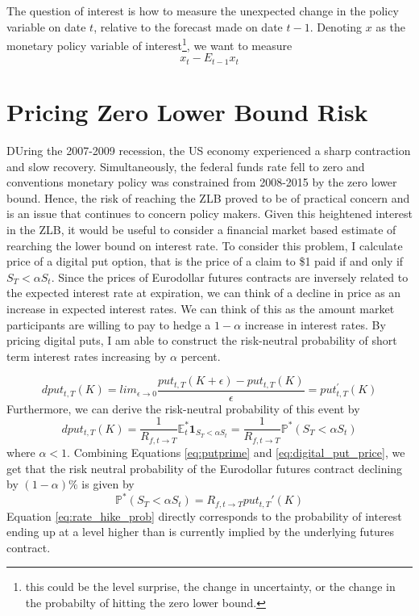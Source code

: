 \documentclass[11pt]{article}
\begin{document}
The question of interest is how to measure the unexpected change in the policy variable on date $t$, relative to the forecast made on date $t-1$. Denoting $x$ as the monetary policy variable of interest\footnote{this could be the level surprise, the change in uncertainty, or the change in the probabilty of hitting the zero lower bound.}, we want to measure 
\begin{equation*}
	x_{t} - E_{t-1}x_{t}
\end{equation*}

\section{Pricing Zero Lower Bound Risk}
DUring the 2007-2009 recession, the US economy experienced a sharp contraction and slow recovery. Simultaneously, the federal funds rate fell to zero and conventions monetary policy was constrained from 2008-2015 by the zero lower bound. Hence, the risk of reaching the ZLB proved to be of practical concern and is an issue that continues to concern policy makers. Given this heightened interest in the ZLB, it would be useful to consider a financial market based estimate of rearching the lower bound on interest rate. To consider this problem, I calculate price of a digital put option, that is the price of a claim to \$1 paid if and only if $S_{T} < \alpha S_{t}$. Since the prices of Eurodollar futures contracts are inversely related to the expected interest rate at expiration, we can think of a decline in price as an increase in expected interest rates. We can think of this as the amount market participants are willing to pay to hedge a $1-\alpha$ increase in interest rates. By pricing digital puts, I am able to construct the risk-neutral probability of short term interest rates increasing by $\alpha$ percent.  


\begin{equation} 
dput_{t, T}(K) = lim_{\epsilon \rightarrow 0} \frac{put_{t, T}(K+\epsilon)-put_{t, T}(K)}{\epsilon} = put_{t, T}^{'}(K)
\label{eq:putprime}
\end{equation}
Furthermore, we can derive the risk-neutral probability of this event by 
\begin{equation}
dput_{t, T}(K) =  \dfrac{1}{R_{f, t\to T}} \mathbb{E}_{t}^{*}\textbf{1}_{S_{T} < \alpha S_{t}} = \dfrac{1}{R_{f, t\to T}}\mathbb{P}^{*}(S_{T}<\alpha S_{t})
\label{eq:digital_put_price}
\end{equation}
where $\alpha < 1$.  Combining Equations \ref{eq:putprime} and \ref{eq:digital_put_price}, we get that the risk neutral probability of the Eurodollar futures contract declining by $(1-\alpha) \%$ is given by 
\begin{equation}
\mathbb{P}^{*}(S_{T}<\alpha S_{t}) = R_{f, t\to T}put_{t, T}'(K)
\label{eq:rate_hike_prob}
\end{equation}
Equation \ref{eq:rate_hike_prob} directly corresponds to the probability of interest ending up at a level higher than is currently implied by the underlying futures contract. 
\end{document}

